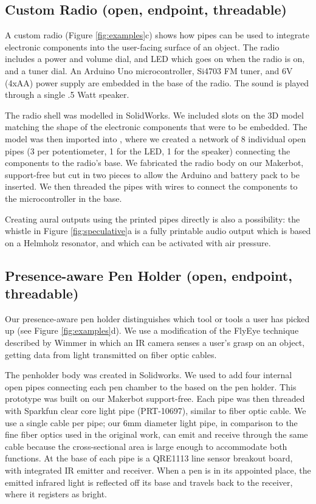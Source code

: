 \subsection{Custom Radio (open, endpoint, threadable)}
A custom radio (Figure \ref{fig:examples}c) shows how pipes can be used to integrate electronic components into the user-facing surface of an object. The radio includes a power and volume dial, and LED which goes on when the radio is on, and a tuner dial. An Arduino Uno microcontroller, Si4703 FM tuner, and 6V (4xAA) power supply are embedded in the base of the radio. The sound is played through a single .5 Watt speaker. %

The radio shell was modelled in SolidWorks. We included slots on the 3D model matching the shape of the electronic components that were to be embedded. The model was then imported into \systemnamenospace, where we created a network of 8 individual open pipes (3 per potentiometer, 1 for the LED, 1 for the speaker) connecting the components to the radio's base. We fabricated the radio body on our Makerbot, support-free but cut in two pieces to allow the Arduino and battery pack to be inserted. We then threaded the pipes with wires to connect the components to the microcontroller in the base.

Creating aural outputs using the printed pipes directly is also a possibility: the whistle in Figure \ref{fig:speculative}a is a fully printable audio output which is based on a Helmholz resonator, and which can be activated with air pressure.

\subsection{Presence-aware Pen Holder (open, endpoint, threadable)}
Our presence-aware pen holder distinguishes which tool or tools a user has picked up (see Figure \ref{fig:examples}d).  We use a modification of the FlyEye technique described by Wimmer \cite{Wimmer-flyeye} in which an IR camera senses a user's grasp on an object, getting data from light transmitted on fiber optic cables.

The penholder body was created in Solidworks. We used \systemname to add four internal open pipes connecting each pen chamber to the based on the pen holder. This prototype was built on our Makerbot support-free.  Each pipe was then threaded with Sparkfun clear core light pipe (PRT-10697), similar to fiber optic cable.  We use a single cable per pipe; our 6mm diameter light pipe, in comparison to the fine fiber optics used in the original work, can emit and receive through the same cable because the cross-sectional area is large enough to accommodate both functions. At the base of each pipe is a QRE1113 line sensor breakout board, with integrated IR emitter and receiver.   When a pen is in its appointed place, the emitted infrared light is reflected off its base and travels back to the receiver, where it registers as bright.

